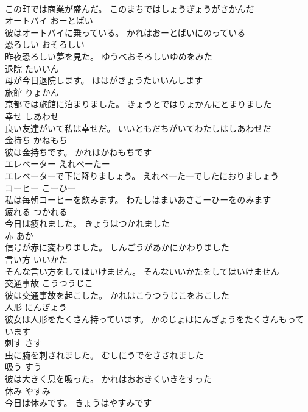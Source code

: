 \documentclass[8pt]{extreport}
\begin{document}
\begin{CJK}{UTF8}{min}
\\	この町では商業が盛んだ。	このまちではしょうぎょうがさかんだ	
\\	オートバイ	おーとばい	
\\	彼はオートバイに乗っている。	かれはおーとばいにのっている	
\\	恐ろしい	おそろしい	
\\	昨夜恐ろしい夢を見た。	ゆうべおそろしいゆめをみた	
\\	退院	たいいん	
\\	母が今日退院します。	ははがきょうたいいんします	
\\	旅館	りょかん	
\\	京都では旅館に泊まりました。	きょうとではりょかんにとまりました	
\\	幸せ	しあわせ	
\\	良い友達がいて私は幸せだ。	いいともだちがいてわたしはしあわせだ	
\\	金持ち	かねもち	
\\	彼は金持ちです。	かれはかねもちです	
\\	エレベーター	えれべーたー	
\\	エレベーターで下に降りましょう。	えれべーたーでしたにおりましょう	
\\	コーヒー	こーひー	
\\	私は毎朝コーヒーを飲みます。	わたしはまいあさこーひーをのみます	
\\	疲れる	つかれる	
\\	今日は疲れました。	きょうはつかれました	
\\	赤	あか	
\\	信号が赤に変わりました。	しんごうがあかにかわりました	
\\	言い方	いいかた	
\\	そんな言い方をしてはいけません。	そんないいかたをしてはいけません	
\\	交通事故	こうつうじこ	
\\	彼は交通事故を起こした。	かれはこうつうじこをおこした	
\\	人形	にんぎょう	
\\	彼女は人形をたくさん持っています。	かのじょはにんぎょうをたくさんもっています	
\\	刺す	さす	
\\	虫に腕を刺されました。	むしにうでをさされました	
\\	吸う	すう	
\\	彼は大きく息を吸った。	かれはおおきくいきをすった	
\\	休み	やすみ	
\\	今日は休みです。	きょうはやすみです	

\end{CJK}
\end{document}
